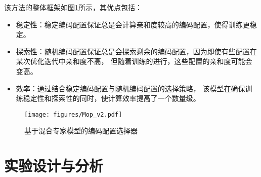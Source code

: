 该方法的整体框架如图\ref{fig:Mop}所示，其优点包括：
\begin{itemize}
\item 稳定性：稳定编码配置保证总是会计算亲和度较高的编码配置，使得训练更稳定。
\item 探索性：随机编码配置保证总是会探索剩余的编码配置，因为即使有些配置在某次优化迭代中亲和度不高，
但随着训练的进行，这些配置的亲和度可能会变高。
\item 效率：通过结合稳定编码配置与随机编码配置的选择策略，
该模型在确保训练稳定性和探索性的同时，使计算效率提高了一个数量级。
\end{itemize}
\begin{figure}[htbp]
    \centering
    \texttt{[image: figures/Mop\_v2.pdf]}
    \caption{基于混合专家模型的编码配置选择器}
    \label{fig:Mop}
\end{figure}


\section{实验设计与分析}



